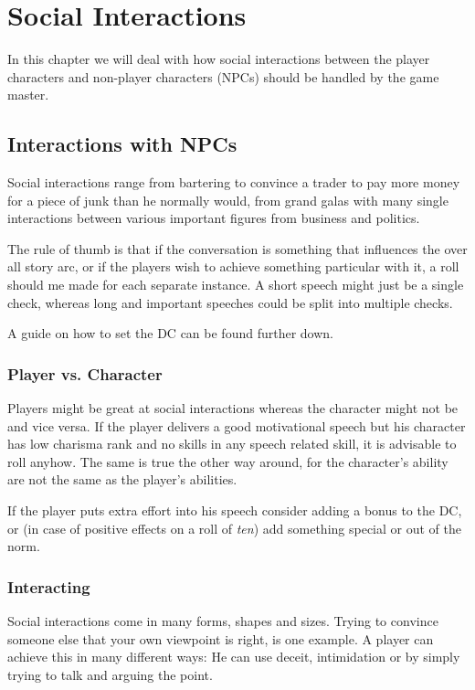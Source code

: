 \chapter{Social Interactions}

In this chapter we will deal with how social interactions between the player
characters and non-player characters (NPCs) should be handled by the game
master.

\section{Interactions with NPCs}

Social interactions range from bartering to convince a trader to pay more
money for a piece of junk than he normally would, from grand galas with many
single interactions between various important figures from business and
politics.

The rule of thumb is that if the conversation is something that influences the
over all story arc, or if the players wish to achieve something particular
with it, a roll should me made for each separate instance. A short speech
might just be a single check, whereas long and important speeches could be
split into multiple checks.

A guide on how to set the DC can be found further down.

\subsection{Player vs. Character}

Players might be great at social interactions whereas the character might not
be and vice versa. If the player delivers a good motivational speech but his
character has low charisma rank and no skills in any speech related skill, it
is advisable to roll anyhow. The same is true the other way around, for the
character's ability are not the same as the player's abilities.

If the player puts extra effort into his speech consider adding a bonus to
the DC, or (in case of positive effects on a roll of \emph{ten}) add something
special or out of the norm.

\subsection{Interacting}

Social interactions come in many forms, shapes and sizes. Trying to convince
someone else that your own viewpoint is right, is one example. A player can
achieve this in many different ways: He can use deceit, intimidation or by
simply trying to talk and arguing the point.

